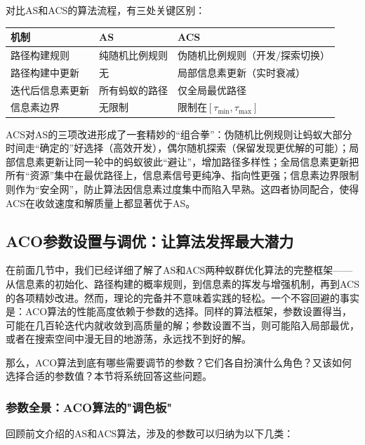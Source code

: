 \documentclass[lang=cn,zihao=-4,a4paper,fontset=windows]{beautybook}
\begin{document}
对比AS和ACS的算法流程，有三处关键区别：

\begin{center}
\begin{tabular}{lll}
\toprule
\textbf{机制} & \textbf{AS} & \textbf{ACS} \\
\midrule
路径构建规则 & 纯随机比例规则 & 伪随机比例规则（开发/探索切换） \\
路径构建中更新 & 无 & 局部信息素更新（实时衰减） \\
迭代后信息素更新 & 所有蚂蚁的路径 & 仅全局最优路径 \\
信息素边界 & 无限制 & 限制在$[\tau_{\min}, \tau_{\max}]$ \\
\bottomrule
\end{tabular}
\end{center}

\begin{fancybox}
ACS对AS的三项改进形成了一套精妙的“组合拳”：伪随机比例规则让蚂蚁大部分时间走“确定的”好选择（高效开发），偶尔随机探索（保留发现更优解的可能）；局部信息素更新让同一轮中的蚂蚁彼此“避让”，增加路径多样性；全局信息素更新把所有“资源”集中在最优路径上，信息素信号更纯净、指向性更强；信息素边界限制则作为“安全网”，防止算法因信息素过度集中而陷入早熟。这四者协同配合，使得ACS在收敛速度和解质量上都显著优于AS。
\end{fancybox}

\subsection{ACO参数设置与调优：让算法发挥最大潜力}

在前面几节中，我们已经详细了解了AS和ACS两种蚁群优化算法的完整框架——从信息素的初始化、路径构建的概率规则，到信息素的挥发与增强机制，再到ACS的各项精妙改进。然而，理论的完备并不意味着实践的轻松。一个不容回避的事实是：ACO算法的性能高度依赖于参数的选择。同样的算法框架，参数设置得当，可能在几百轮迭代内就收敛到高质量的解；参数设置不当，则可能陷入局部最优，或者在搜索空间中漫无目的地游荡，永远找不到好的解。

那么，ACO算法到底有哪些需要调节的参数？它们各自扮演什么角色？又该如何选择合适的参数值？本节将系统回答这些问题。

\subsubsection{参数全景：ACO算法的"调色板"}

回顾前文介绍的AS和ACS算法，涉及的参数可以归纳为以下几类：
\end{document}
